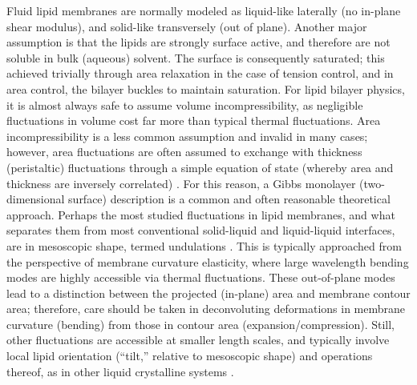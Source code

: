 \documentclass[9pt,bestpractices]{livecoms}
\begin{document}
Fluid lipid membranes are normally modeled as liquid-like laterally (no in-plane shear modulus), and solid-like transversely (out of plane).
Another major assumption is that the lipids are strongly surface active, and therefore are not soluble in bulk (aqueous) solvent.
The surface is consequently saturated; this achieved trivially through area relaxation in the case of tension control, and in area control, the bilayer buckles to maintain saturation.
For lipid bilayer physics, it is almost always safe to assume volume incompressibility, as negligible fluctuations in volume cost far more than typical thermal fluctuations.
Area incompressibility is a less common assumption and invalid in many cases; however, area fluctuations are often assumed to exchange with thickness (peristaltic) fluctuations through a simple equation of state (whereby area and thickness are inversely correlated) \cite{Safran1994}.
For this reason, a Gibbs monolayer (two-dimensional surface) description is a common and often reasonable theoretical approach.
Perhaps the most studied fluctuations in lipid membranes, and what separates them from most conventional solid-liquid and liquid-liquid interfaces, are in mesoscopic shape, termed undulations \cite{Canham1970b,Helfrich1973a}.
This is typically approached from the perspective of membrane curvature elasticity, where large wavelength bending modes are highly accessible via thermal fluctuations.
These out-of-plane modes lead to a distinction between the projected (in-plane) area and membrane contour area; therefore, care should be taken in deconvoluting deformations in membrane curvature (bending) from those in contour area (expansion/compression).
Still, other fluctuations are accessible at smaller length scales, and typically involve local lipid orientation (``tilt,'' relative to mesoscopic shape) and operations thereof, as in other liquid crystalline systems \cite{Hamm2000,May2007,Watson2011a,Watson2013b}.
\end{document}
